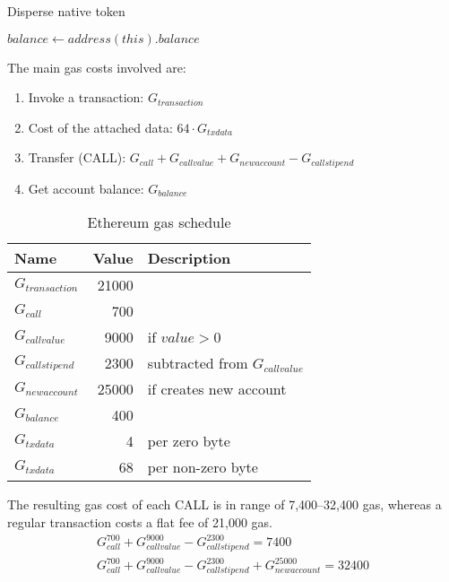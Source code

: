 \documentclass[12pt]{article}
\begin{document}
\begin{algorithm}[h]
	\label{native}
	\caption{Disperse native token}
	\BlankLine
	\For{$i \in [0 \dots recipients.length)$}{
		recipients[i].transfer(values[i])
	}
	$balance \leftarrow address(this).balance$ \\
\end{algorithm}

The main gas costs involved are:
\begin{enumerate}
	\item Invoke a transaction: $G_{transaction}$
	\item Cost of the attached data: $64 \cdot G_{txdata}$
	\item Transfer (CALL): $G_{call} + G_{callvalue} + G_{newaccount} - G_{callstipend}$
	\item Get account balance: $G_{balance}$
\end{enumerate}

\begin{table}[h]
\caption{Ethereum gas schedule}
\label{gas-costs-2}
\begin{center}
\begin{tabular}{l r l}
	Name & Value & Description \\ \hline
	$G_{transaction}$ & 21000 \\
	$G_{call}$ & 700 \\
	$G_{callvalue}$ & 9000 & if $value > 0$ \\
	$G_{callstipend}$ & 2300 & subtracted from $G_{callvalue}$ \\
	$G_{newaccount}$ & 25000 & if creates new account \\
	$G_{balance}$ & 400 \\
	$G_{txdata}$ & 4 & per zero byte \\
	$G_{txdata}$ & 68 & per non-zero byte \\

\end{tabular}
\end{center}
\end{table}

The resulting gas cost of each CALL\cite{subtleties} is in range of 7,400--32,400 gas, whereas a regular transaction costs a flat fee of 21,000 gas.
%
\begin{gather}
G_{call}^{700} + G_{callvalue}^{9000} - G_{callstipend}^{2300} = 7400 \\
G_{call}^{700} + G_{callvalue}^{9000} - G_{callstipend}^{2300} + G_{newaccount}^{25000} = 32400
\end{gather}
\end{document}
